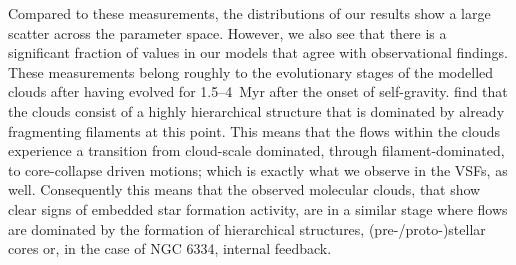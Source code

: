 \documentclass{aa}		%
\begin{document}
Compared to these measurements, the distributions of our results show a large scatter across the parameter space. 
However, we also see that there is a significant fraction of values in our models that agree with observational findings. 
These measurements belong roughly to the evolutionary stages of the modelled clouds after having evolved for 1.5--4~Myr after the onset of self-gravity.
 find that the clouds consist of a highly hierarchical structure that is dominated by already fragmenting filaments at this point.
This means that the flows within the clouds experience a transition from cloud-scale dominated, through filament-dominated, to core-collapse driven motions; which is exactly what we observe in the VSFs, as well.
Consequently this means that the observed molecular clouds, that show clear signs of embedded star formation activity, are in a similar stage where flows are dominated by the formation of hierarchical structures, (pre-/proto-)stellar cores or, in the case of NGC 6334, internal feedback.
\end{document}
